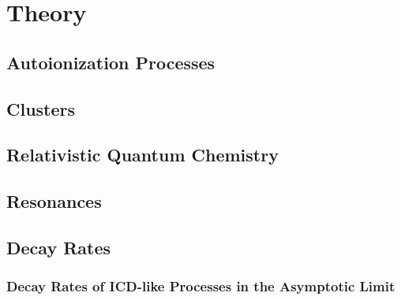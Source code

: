 \chapter{Theory}

\section{Autoionization Processes}
\section{Clusters}
\section{Relativistic Quantum Chemistry}
\section{Resonances}
\section{Decay Rates}
\subsection{Decay Rates of ICD-like Processes in the Asymptotic Limit}

